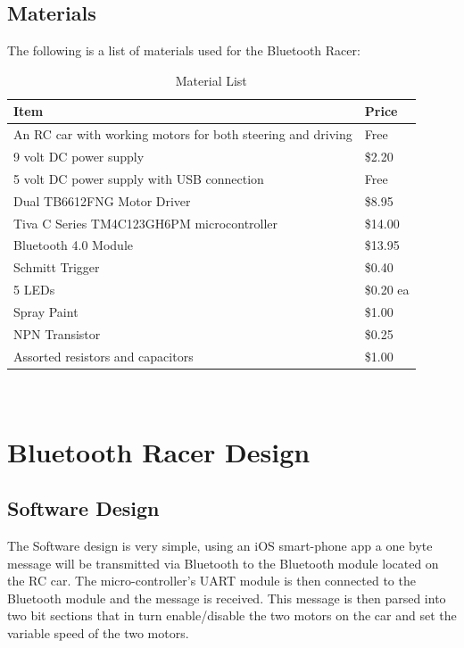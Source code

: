 \documentclass[12pt]{article}
\begin{document}
\subsection{Materials}
The following is a list of materials used for the Bluetooth Racer:
\begin{table}[H]
\centering
\caption{Material List}
\begin{tabular}{ll}\\
\hline
Item                                                        & Price     \\ \hline
An RC car with working motors for both steering and driving & Free      \\ \hline
9 volt DC power supply                                      & \$2.20    \\ \hline
5 volt DC power supply with USB connection                  & Free      \\ \hline
Dual TB6612FNG Motor Driver                                 & \$8.95    \\ \hline
Tiva C Series TM4C123GH6PM microcontroller                  & \$14.00   \\ \hline
Bluetooth 4.0 Module                                        & \$13.95   \\ \hline
Schmitt Trigger                                             & \$0.40    \\ \hline
5 LEDs                                                      & \$0.20 ea \\ \hline
Spray Paint                                                 & \$1.00    \\ \hline
NPN Transistor                                              & \$0.25    \\ \hline
Assorted resistors and capacitors                           & \$1.00    \\ \hline
\end{tabular}\\
\end{table}

\section{Bluetooth Racer Design}

\subsection{Software Design}
The Software design is very simple, using an iOS smart-phone app a one byte message will be transmitted via Bluetooth to the Bluetooth module located on the RC car. The micro-controller's UART module is then connected to the Bluetooth module and the message is received. This message is then parsed into two bit sections that in turn enable/disable the two motors on the car and set the variable speed of the two motors. \\
\end{document}
